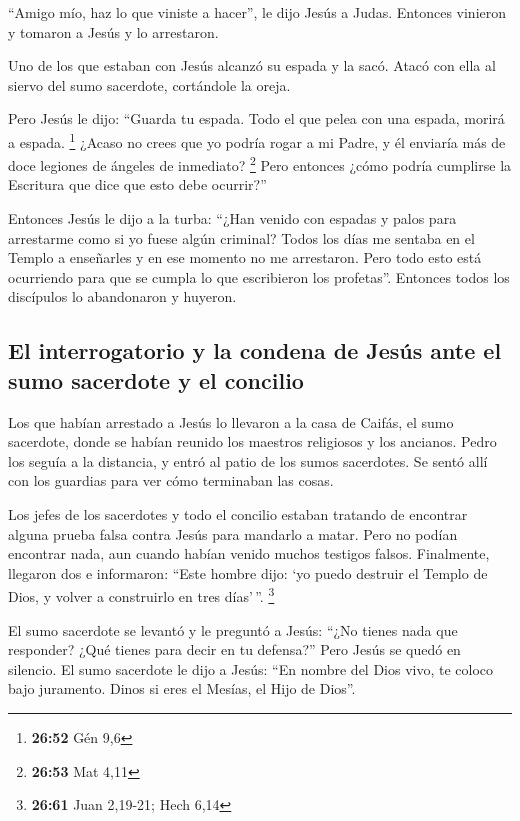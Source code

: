  ``Amigo mío, haz lo que viniste a hacer'', le dijo Jesús
a Judas. Entonces vinieron y tomaron a Jesús y lo arrestaron.

 Uno de los que estaban con Jesús alcanzó su espada y la
sacó. Atacó con ella al siervo del sumo sacerdote, cortándole la oreja.

 Pero Jesús le dijo: ``Guarda tu espada. Todo el que
pelea con una espada, morirá a espada. \footnote{\textbf{26:52} Gén 9,6}
 ¿Acaso no crees que yo podría rogar a mi Padre, y él
enviaría más de doce legiones de ángeles de inmediato? \footnote{\textbf{26:53}
  Mat 4,11}  Pero entonces ¿cómo podría cumplirse la
Escritura que dice que esto debe ocurrir?''

 Entonces Jesús le dijo a la turba: ``¿Han venido con
espadas y palos para arrestarme como si yo fuese algún criminal? Todos
los días me sentaba en el Templo a enseñarles y en ese momento no me
arrestaron.  Pero todo esto está ocurriendo para que se
cumpla lo que escribieron los profetas''. Entonces todos los discípulos
lo abandonaron y huyeron.

\hypertarget{el-interrogatorio-y-la-condena-de-jesuxfas-ante-el-sumo-sacerdote-y-el-concilio}{%
\subsection{El interrogatorio y la condena de Jesús ante el sumo
sacerdote y el
concilio}\label{el-interrogatorio-y-la-condena-de-jesuxfas-ante-el-sumo-sacerdote-y-el-concilio}}

 Los que habían arrestado a Jesús lo llevaron a la casa
de Caifás, el sumo sacerdote, donde se habían reunido los maestros
religiosos y los ancianos.  Pedro los seguía a la
distancia, y entró al patio de los sumos sacerdotes. Se sentó allí con
los guardias para ver cómo terminaban las cosas.

 Los jefes de los sacerdotes y todo el concilio estaban
tratando de encontrar alguna prueba falsa contra Jesús para mandarlo a
matar.  Pero no podían encontrar nada, aun cuando habían
venido muchos testigos falsos. Finalmente, llegaron dos 
e informaron: ``Este hombre dijo: `yo puedo destruir el Templo de Dios,
y volver a construirlo en tres días'\,''. \footnote{\textbf{26:61} Juan
  2,19-21; Hech 6,14}

 El sumo sacerdote se levantó y le preguntó a Jesús:
``¿No tienes nada que responder? ¿Qué tienes para decir en tu defensa?''
 Pero Jesús se quedó en silencio. El sumo sacerdote le
dijo a Jesús: ``En nombre del Dios vivo, te coloco bajo juramento. Dinos
si eres el Mesías, el Hijo de Dios''.

